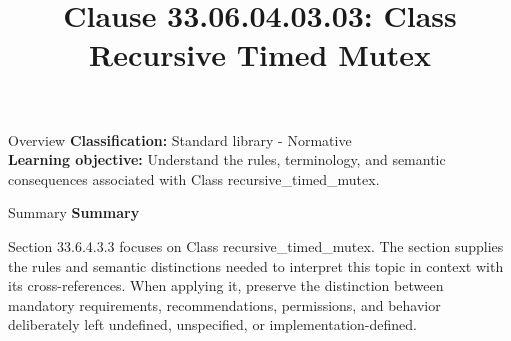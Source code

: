 \documentclass[10pt,letterpaper]{article}
\title{Clause 33.06.04.03.03: Class Recursive Timed Mutex}
\author{}
\date{}
\begin{document}
\maketitle
\begin{CornellOverviewBox}{Overview}
\textbf{Classification:} Standard library - Normative\\[2pt]
\textbf{Learning objective:} Understand the rules, terminology, and semantic consequences associated with Class recursive\_timed\_mutex.
\end{CornellOverviewBox}\begin{CornellSummaryBox}{Summary}
{\sffamily\bfseries\color{Accent} Summary}\par\vspace{3pt}Section 33.6.4.3.3 focuses on Class recursive\_timed\_mutex. The section supplies the rules and semantic distinctions needed to interpret this topic in context with its cross-references. When applying it, preserve the distinction between mandatory requirements, recommendations, permissions, and behavior deliberately left undefined, unspecified, or implementation-defined.
\end{CornellSummaryBox}
\end{document}
